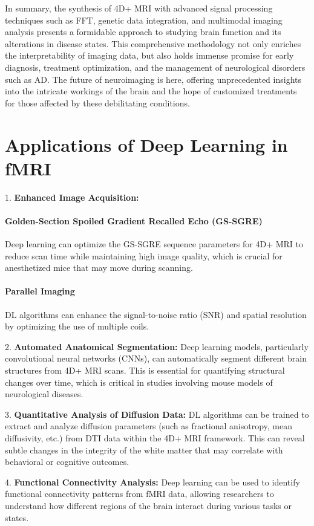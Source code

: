 \documentclass[twocolumn]{article}
\begin{document}
In summary, the synthesis of 4D+ MRI with advanced signal processing techniques such as FFT, genetic data integration, and multimodal imaging analysis presents a formidable approach to studying brain function and its alterations in disease states. This comprehensive methodology not only enriches the interpretability of imaging data, but also holds immense promise for early diagnosis, treatment optimization, and the management of neurological disorders such as AD. The future of neuroimaging is here, offering unprecedented insights into the intricate workings of the brain and the hope of customized treatments for those affected by these debilitating conditions.

\section*{Applications of Deep Learning in fMRI}

1. \textbf{Enhanced Image Acquisition:}
\paragraph{Golden-Section Spoiled Gradient Recalled Echo (GS-SGRE)}
Deep learning can optimize the GS-SGRE sequence parameters for 4D+ MRI to reduce scan time while maintaining high image quality, which is crucial for anesthetized mice that may move during scanning.

\paragraph{Parallel Imaging} DL algorithms can enhance the signal-to-noise ratio (SNR) and spatial resolution by optimizing the use of multiple coils.

2. \textbf{Automated Anatomical Segmentation:}
Deep learning models, particularly convolutional neural networks (CNNs), can automatically segment different brain structures from 4D+ MRI scans. This is essential for quantifying structural changes over time, which is critical in studies involving mouse models of neurological diseases.

3. \textbf{Quantitative Analysis of Diffusion Data:}
DL algorithms can be trained to extract and analyze diffusion parameters (such as fractional anisotropy, mean diffusivity, etc.) from DTI data within the 4D+ MRI framework. This can reveal subtle changes in the integrity of the white matter that may correlate with behavioral or cognitive outcomes.

4. \textbf{Functional Connectivity Analysis:}
Deep learning can be used to identify functional connectivity patterns from fMRI data, allowing researchers to understand how different regions of the brain interact during various tasks or states.
\end{document}
